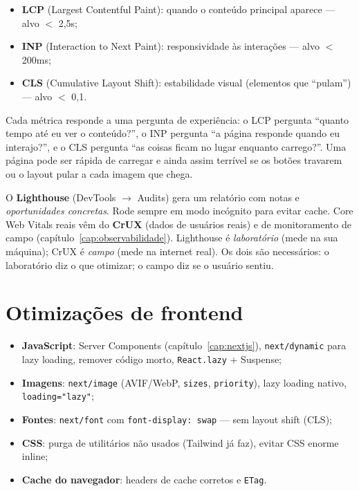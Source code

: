 \begin{itemize}[leftmargin=*, itemsep=0.4em]
  \item \textbf{LCP} (Largest Contentful Paint): quando o conteúdo principal aparece — alvo $<$ 2,5s;
  \item \textbf{INP} (Interaction to Next Paint): responsividade às interações — alvo $<$ 200ms;
  \item \textbf{CLS} (Cumulative Layout Shift): estabilidade visual (elementos que ``pulam'') — alvo $<$ 0,1.
\end{itemize}

\begin{caixaconceito}
Cada métrica responde a uma pergunta de experiência: o LCP pergunta ``quanto
tempo até eu ver o conteúdo?'', o INP pergunta ``a página responde quando eu
interajo?'', e o CLS pergunta ``as coisas ficam no lugar enquanto carrego?''.
Uma página pode ser rápida de carregar e ainda assim terrível se os botões
travarem ou o layout pular a cada imagem que chega.
\end{caixaconceito}

\begin{caixadica}
O \textbf{Lighthouse} (DevTools $\rightarrow$ Audits) gera um relatório com
notas e \emph{oportunidades concretas}. Rode sempre em modo incógnito para
evitar cache. Core Web Vitals reais vêm do \textbf{CrUX} (dados de usuários
reais) e de monitoramento de campo (capítulo~\ref{cap:observabilidade}).
Lighthouse é \emph{laboratório} (mede na sua máquina); CrUX é \emph{campo}
(mede na internet real). Os dois são necessários: o laboratório diz o que
otimizar; o campo diz se o usuário sentiu.
\end{caixadica}

\section{Otimizações de frontend}

\begin{itemize}[leftmargin=*, itemsep=0.4em]
  \item \textbf{JavaScript}: Server Components (capítulo~\ref{cap:nextjs}), \texttt{next/dynamic} para lazy loading, remover código morto, \texttt{React.lazy} + Suspense;
  \item \textbf{Imagens}: \texttt{next/image} (AVIF/WebP, \texttt{sizes}, \texttt{priority}), lazy loading nativo, \texttt{loading="lazy"};
  \item \textbf{Fontes}: \texttt{next/font} com \texttt{font-display: swap} — sem layout shift (CLS);
  \item \textbf{CSS}: purga de utilitários não usados (Tailwind já faz), evitar CSS enorme inline;
  \item \textbf{Cache do navegador}: headers de cache corretos e \texttt{ETag}.
\end{itemize}

